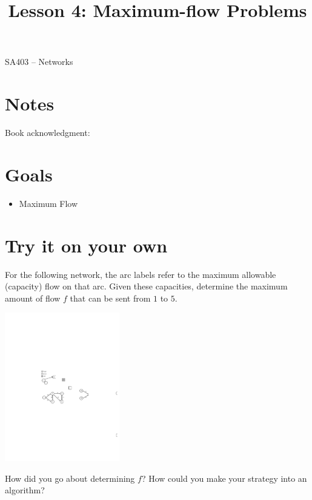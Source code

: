 \documentclass[12pt]{article}
\makeatletter
\theoremstyle{definition}
\newcommand{\graphbox}[5]%
{
\begin{tikzpicture}
     [>=latex,scale=#5]
     
     \draw [->,very thick] (#1, 0) -- (#2, 0) node[right] {$x$};
     \draw [->,very thick] (0, #3) -- (0, #4) node[above] {$y$};
     
     \draw[step=1cm,thick,dotted] (#1,#3) grid (#2,#4);
   \end{tikzpicture}
   }
\renewcommand{\maketitle}{
  \noindent SA403 -- Networks \\

  \begin{center}\Large{\textbf{\@title}}\end{center}
}
\makeatother
\begin{document}

\title{Lesson 4: Maximum-flow Problems}


\maketitle


\section*{Notes}

Book acknowledgment:
\section*{Goals}
\begin{itemize}
\item Maximum Flow
\end{itemize}

\section{Try it on your own}

For the following network, the arc labels refer to the maximum allowable (capacity) flow on that arc. Given these capacities, determine the maximum amount of flow $f$ that can be sent from $1$ to $5$.



\begin{center}
\includegraphics[width=5cm]{shortestpathexample1}
\end{center}
\vfill


How did you go about determining $f$? How could you make your strategy into an algorithm? 
\end{document}
